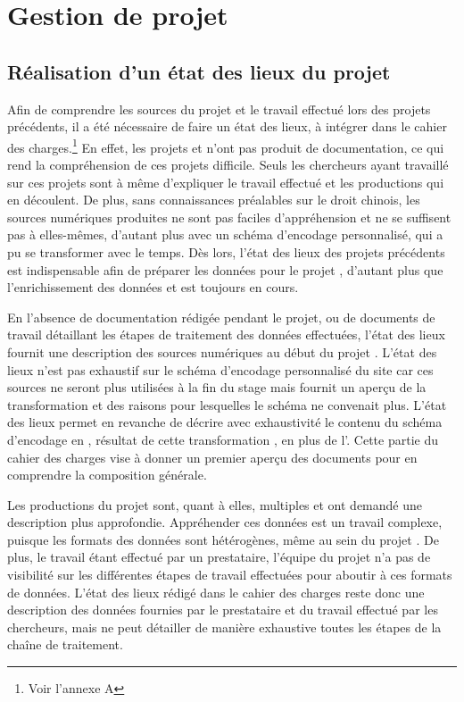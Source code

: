 \section{Gestion de projet}
    \subsection{Réalisation d’un état des lieux du projet}

Afin de comprendre les sources du projet \COREL et le travail effectué lors des projets précédents, il a été nécessaire de faire un état des lieux, à intégrer dans le cahier des charges.\footnote{Voir l'annexe A} En effet, les projets \LSC et \EPJ n'ont pas produit de documentation, ce qui rend la compréhension de ces projets difficile. Seuls les chercheurs ayant travaillé sur ces projets sont à même d'expliquer le travail effectué et les productions qui en découlent. De plus, sans connaissances préalables sur le droit chinois, les sources numériques produites ne sont pas faciles d'appréhension et ne se suffisent pas à elles-mêmes, d'autant plus avec un schéma d'encodage personnalisé, qui a pu se transformer avec le temps. Dès lors, l'état des lieux des projets précédents est indispensable afin de préparer les données pour le projet \COREL, d'autant plus que l'enrichissement des données \LSC et \EPJ est toujours en cours. 

En l'absence de documentation rédigée pendant le projet, ou de documents de travail détaillant les étapes de traitement des données effectuées, l'état des lieux fournit une description des sources numériques au début du projet \COREL. L'état des lieux n'est pas exhaustif sur le schéma d'encodage personnalisé du site \LSC car ces sources ne seront plus utilisées à la fin du stage mais fournit un aperçu de la transformation \XSLT et des raisons pour lesquelles le schéma \LSC ne convenait plus. L'état des lieux permet en revanche de décrire avec exhaustivité le contenu du schéma d'encodage en \TEI, résultat de cette transformation \XSLT, en plus de l'\ODD. Cette partie du cahier des charges vise à donner un premier aperçu des documents pour en comprendre la composition générale. 

Les productions du projet \EPJ sont, quant à elles, multiples et ont demandé une description plus approfondie. Appréhender ces données est un travail complexe, puisque les formats des données sont hétérogènes, même au sein du projet \EPJ. De plus, le travail étant effectué par un prestataire, l'équipe du projet n'a pas de visibilité sur les différentes étapes de travail effectuées pour aboutir à ces formats de données. L'état des lieux rédigé dans le cahier des charges reste donc une description des données fournies par le prestataire et du travail effectué par les chercheurs, mais ne peut détailler de manière exhaustive toutes les étapes de la chaîne de traitement.

